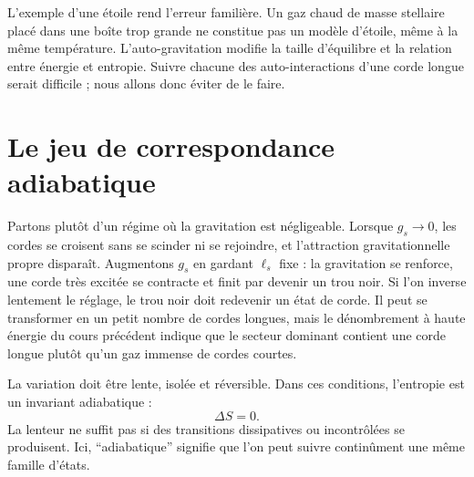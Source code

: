 L’exemple d’une étoile rend l’erreur familière. Un gaz chaud de masse stellaire placé dans une boîte trop grande ne constitue pas un modèle d’étoile, même à la même température. L’auto-gravitation modifie la taille d’équilibre et la relation entre énergie et entropie. Suivre chacune des auto-interactions d’une corde longue serait difficile ; nous allons donc éviter de le faire.

\begin{classroomqa}
\end{classroomqa}

\section{Le jeu de correspondance adiabatique}

Partons plutôt d’un régime où la gravitation est négligeable. Lorsque \(g_s\to0\), les cordes se croisent sans se scinder ni se rejoindre, et l’attraction gravitationnelle propre disparaît. Augmentons \(g_s\) en gardant \(\ell_s\) fixe : la gravitation se renforce, une corde très excitée se contracte et finit par devenir un trou noir. Si l’on inverse lentement le réglage, le trou noir doit redevenir un état de corde. Il peut se transformer en un petit nombre de cordes longues, mais le dénombrement à haute énergie du cours précédent indique que le secteur dominant contient une corde longue plutôt qu’un gaz immense de cordes courtes.

\begin{classroomqa}
\end{classroomqa}

La variation doit être lente, isolée et réversible. Dans ces conditions, l’entropie est un invariant adiabatique :
\begin{equation}
\Delta S=0.
\label{eq:l07-adiabatic}
\end{equation}
La lenteur ne suffit pas si des transitions dissipatives ou incontrôlées se produisent. Ici, ``adiabatique'' signifie que l’on peut suivre continûment une même famille d’états.

